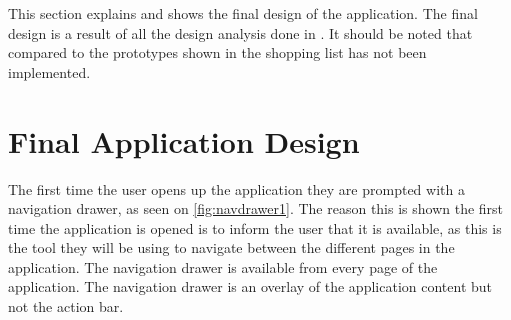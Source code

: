 This section explains and shows the final design of the application. The final design is a result of all the design analysis done in . It should be noted that compared to the prototypes shown in  the shopping list has not been implemented.

\section{Final Application Design}
The first time the user opens up the application they are prompted with a navigation drawer, as seen on \autoref{fig:navdrawer1}. The reason this is shown the first time the application is opened is to inform the user that it is available, as this is the tool they will be using to navigate between the different pages in the application. The navigation drawer is available from every page of the application. The navigation drawer is an overlay of the application content but not the action bar\citep{guidelines-navigationdrawer}.

